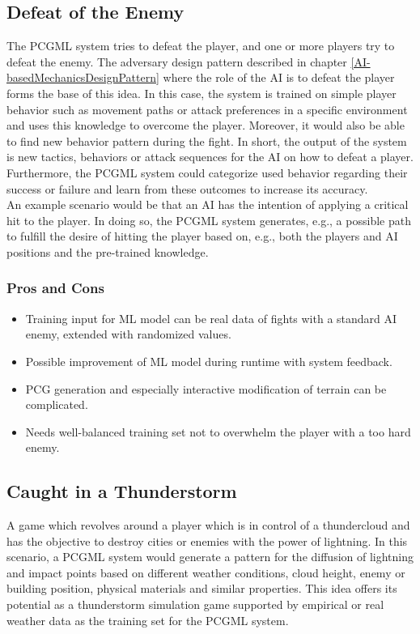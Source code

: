 \documentclass[MGS,Master,english]{twbook}%
\begin{document}
\subsection{Defeat of the Enemy} \label{idea::defeatTheEnemy}
The PCGML system tries to defeat the player, and one or more players try to defeat the enemy. The adversary design pattern described in chapter \ref{AI-basedMechanicsDesignPattern} where the role of the AI is to defeat the player forms the base of this idea. In this case, the system is trained on simple player behavior such as movement paths or attack preferences in a specific environment and uses this knowledge to overcome the player. Moreover, it would also be able to find new behavior pattern during the fight. In short, the output of the system is new tactics, behaviors or attack sequences for the AI on how to defeat a player. Furthermore, the PCGML system could categorize used behavior regarding their success or failure and learn from these outcomes to increase its accuracy. \\
An example scenario would be that an AI has the intention of applying a critical hit to the player. In doing so, the PCGML system generates, e.g., a possible path to fulfill the desire of hitting the player based on, e.g., both the players and AI positions and the pre-trained knowledge.

\subsubsection{Pros and Cons}
\begin{itemize}
	\item Training input for ML model can be real data of fights with a standard AI enemy, extended with randomized values.
	\item Possible improvement of ML model during runtime with system feedback.
	\item PCG generation and especially interactive modification of terrain can be complicated.
	\item Needs well-balanced training set not to overwhelm the player with a too hard enemy.
\end{itemize}


\subsection{Caught in a Thunderstorm} \label{idea::caughtInAThunderstorm}
A game which revolves around a player which is in control of a thundercloud and has the objective to destroy cities or enemies with the power of lightning. In this scenario, a PCGML system would generate a pattern for the diffusion of lightning and impact points based on different weather conditions, cloud height, enemy or building position, physical materials and similar properties. This idea offers its potential as a thunderstorm simulation game supported by empirical or real weather data as the training set for the PCGML system.
\end{document}
